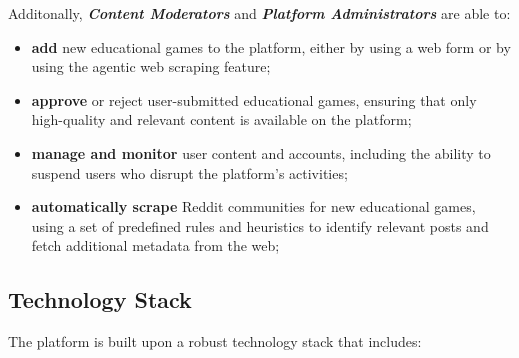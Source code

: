 \documentclass[11pt,italian,a4paper]{article}
\begin{document}
\noindent Additonally, \textbf{\textit{Content Moderators}} and \textbf{\textit{Platform Administrators}} are able to:
\begin{itemize}
    \item \textbf{add} new educational games to the platform, either by using a web form or by using the agentic web scraping feature;
    \item \textbf{approve} or reject user-submitted educational games, ensuring that only high-quality and relevant content is available on the platform;
    \item \textbf{manage and monitor} user content and accounts, including the ability to suspend users who disrupt the platform's activities;
    \item \textbf{automatically scrape} Reddit communities for new educational games, using a set of predefined rules and heuristics to identify relevant posts and fetch additional metadata from the web;
\end{itemize}

\subsection{Technology Stack}
The platform is built upon a robust technology stack that includes:
\end{document}
